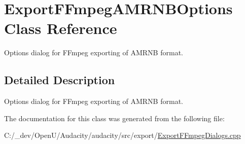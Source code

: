 \hypertarget{class_export_f_fmpeg_a_m_r_n_b_options}{}\section{Export\+F\+Fmpeg\+A\+M\+R\+N\+B\+Options Class Reference}
\label{class_export_f_fmpeg_a_m_r_n_b_options}


Options dialog for F\+Fmpeg exporting of A\+M\+R\+NB format.  




\subsection{Detailed Description}
Options dialog for F\+Fmpeg exporting of A\+M\+R\+NB format. 

The documentation for this class was generated from the following file\+:\begin{DoxyCompactItemize}
\item 
C\+:/\+\_\+dev/\+Open\+U/\+Audacity/audacity/src/export/\hyperlink{_export_f_fmpeg_dialogs_8cpp}{Export\+F\+Fmpeg\+Dialogs.\+cpp}\end{DoxyCompactItemize}
